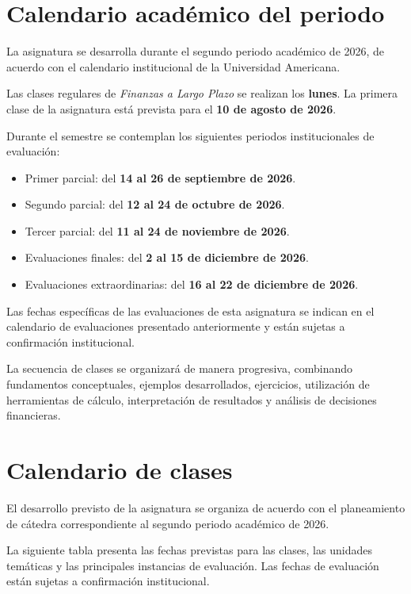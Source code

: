 \documentclass[12pt,a4paper]{article}
\begin{document}
\section{Calendario académico del periodo}

La asignatura se desarrolla durante el segundo periodo académico de 2026,
de acuerdo con el calendario institucional de la Universidad Americana.\parencite{ua2026calendarioAcademico}

Las clases regulares de \textit{Finanzas a Largo Plazo} se realizan los
\textbf{lunes}. La primera clase de la asignatura está prevista para el
\textbf{10 de agosto de 2026}.\parencite{armoa2026planeamiento}

Durante el semestre se contemplan los siguientes periodos institucionales
de evaluación:

\begin{itemize}
    \item Primer parcial: del \textbf{14 al 26 de septiembre de 2026}.
    \item Segundo parcial: del \textbf{12 al 24 de octubre de 2026}.
    \item Tercer parcial: del \textbf{11 al 24 de noviembre de 2026}.
    \item Evaluaciones finales: del \textbf{2 al 15 de diciembre de 2026}.
    \item Evaluaciones extraordinarias: del \textbf{16 al 22 de diciembre de 2026}.
\end{itemize}
\parencite{ua2026calendarioAcademico}

Las fechas específicas de las evaluaciones de esta asignatura se indican
en el calendario de evaluaciones presentado anteriormente y están sujetas
a confirmación institucional.

La secuencia de clases se organizará de manera progresiva, combinando
fundamentos conceptuales, ejemplos desarrollados, ejercicios, utilización
de herramientas de cálculo, interpretación de resultados y análisis de
decisiones financieras.

\section{Calendario de clases}

El desarrollo previsto de la asignatura se organiza de acuerdo con el
planeamiento de cátedra correspondiente al segundo periodo académico de
2026.\parencite{armoa2026planeamiento}

La siguiente tabla presenta las fechas previstas para las clases, las
unidades temáticas y las principales instancias de evaluación. Las fechas de
evaluación están sujetas a confirmación institucional.
\end{document}
